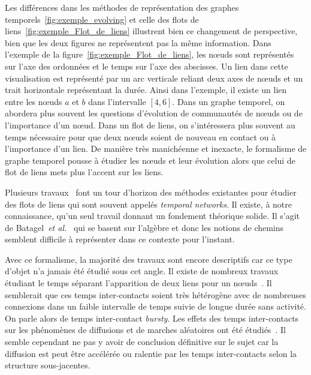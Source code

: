Les différences dans les méthodes de représentation des graphes temporels~\ref{fig:exemple_evolving} et celle des flots de liens~\ref{fig:exemple_Flot_de_liens} illustrent bien ce changement de perspective, bien que les deux figures ne représentent pas la même information.
Dans l'exemple de la figure~\ref{fig:exemple_Flot_de_liens}, les n\oe uds sont représentés sur l'axe des ordonnées et le temps sur l'axe des abscisses.
Un lien dans cette visualisation est représenté par un arc verticale reliant deux axes de n\oe uds et un trait horizontale représentant la durée.
Ainsi dans l'exemple, il existe un lien entre les n\oe uds $a$ et $b$ dans l'intervalle $[4,6]$.
Dans un graphe temporel, on abordera plus souvent les questions d'évolution de communautés de n\oe uds ou de l'importance d'un n\oe ud.
Dans un flot de liens, on s'intéressera plus souvent au temps nécessaire pour que deux n\oe uds soient de nouveau en contact ou à l'importance d'un lien.
De manière très manichéenne et inexacte, le formalisme de graphe temporel pousse à étudier les n\oe uds et leur évolution alors que celui de flot de liens mets plus l'accent sur les liens.


Plusieurs travaux~\cite{Holme2013a,Holme2015b,Holme2015} font un tour d'horizon des méthodes existantes pour étudier des flots de liens qui sont souvent appelés \emph{temporal networks}.
Il existe, à notre connaissance, qu'un seul travail donnant un fondement théorique solide.
Il s'agit de Batagel~\emph{et al.}~\cite{Batagelj2015} qui se basent sur l'algèbre et donc les notions de chemins semblent difficile à représenter dans ce contexte pour l'instant.\bigskip


Avec ce formalisme, la majorité des travaux sont encore descriptifs car ce type d'objet n'a jamais été étudié sous cet angle.
Il existe de nombreux travaux étudiant le temps séparant l'apparition de deux liens pour un n\oe uds~\cite{Malmgren2008,Malmgren2009}.
Il semblerait que ces temps inter-contacts soient très hétérogène avec de nombreuses connexions dans un faible intervalle de temps suivie de longue durée sans activité.
On parle alors de temps inter-contact \emph{bursty}.
Les effets des temps inter-contacts sur les phénomènes de diffusions et de marches aléatoires ont été étudiés~\cite{Karsai2011,Karsai2012a,Starnini2012b,Rocha2013}.
Il semble cependant ne pas y avoir de conclusion définitive sur le sujet car la diffusion est peut être accélérée ou ralentie par les temps inter-contacts selon la structure sous-jacentes.

